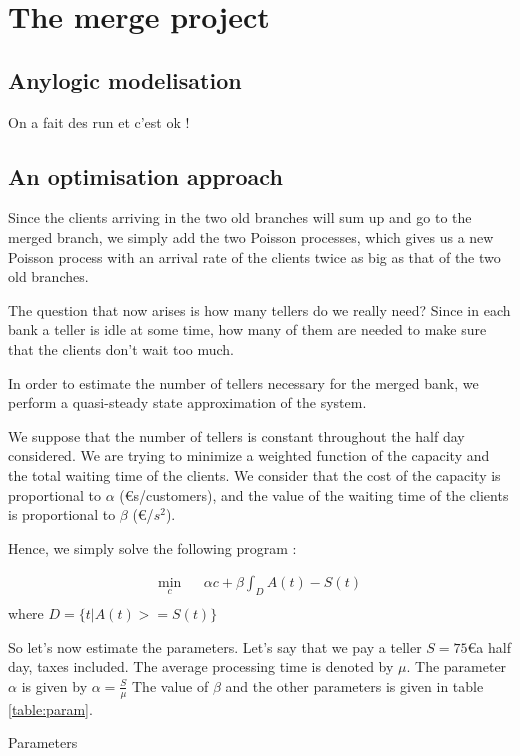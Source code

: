 \documentclass[12pt,a4paper,notitlepage]{report}
\begin{document}
\section*{The merge project}
\subsection*{Anylogic modelisation}
    On a fait des run et c'est ok !
\subsection*{An optimisation approach}
 Since the clients arriving in the two old branches will sum up and go to the merged branch, we simply add the two Poisson processes, which gives us a new Poisson process with an arrival rate of the clients twice as big as that of the two old branches.

The question that now arises is how many tellers do we really need? Since in each bank a teller is idle at some time, how many of them are needed to make sure that the clients don't wait too much.


In order to estimate the number of tellers necessary for the merged bank, we perform a quasi-steady state approximation of the system. 

We suppose that the number of tellers is constant throughout the half day considered.
We are trying to minimize a weighted function of the capacity and the total waiting time of the clients.
We consider that the cost of the capacity is proportional to $ \alpha$ (\euro s/customers), and the value of the waiting time of the clients is proportional to $\beta$ (\euro/$s^2$).

Hence, we simply solve the following program :

\begin{eqnarray*}
\min_c & & \alpha c + \beta \int_D A(t)-S(t)\\
\end{eqnarray*}
where $D = \{t | A(t)>=S(t) \}$

So let's now estimate the parameters. Let's say that we pay a teller $S = 75$\euro  a half day, taxes included.
The average processing time is denoted by $\mu$. 
The parameter $\alpha$ is given by $\alpha = \frac{S}{\mu}$
The value of $\beta$ and the other parameters is given in table \ref{table:param}.
\begin{table}

\caption{Parameters\label{table:param}}
\end{table}
\end{document}
